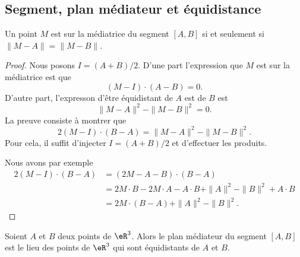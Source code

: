 \subsection{Segment, plan médiateur et équidistance}

\begin{lemma}   \label{LEMooSZZWooPDHnGl}
	Un point \( M\) est sur la médiatrice du segment \( [A,B]\) si et seulement si \( \| M-A \|=\| M-B \|\).
\end{lemma}

\begin{proof}
	Nous posons \( I=(A+B)/2\). D'une part l'expression que \( M\) est sur la médiatrice est que
	\begin{equation}
		(M-I)\cdot (A-B)=0.
	\end{equation}
	D'autre part, l'expresson d'être équidistant de \( A\) est de \( B\) est
	\begin{equation}
		\| M-A \|^2-\| M-B \|^2=0.
	\end{equation}
	La preuve consiste à montrer que
	\begin{equation}
		2(M-I)\cdot (B-A)=\| M-A \|^2-\| M-B \|^2.
	\end{equation}
	Pour cela, il suffit d'injecter \( I=(A+B)/2\) et d'effectuer les produits.

	Nous avons par exemple
	\begin{subequations}
		\begin{align}
			2(M-I)\cdot (B-A) & =(2M-A-B)\cdot(B-A)                                        \\
			                  & =2M\cdot B-2M\cdot A-A\cdot B+\| A \|^2-\| B \|^2+A\cdot B \\
			                  & =2M\cdot (B-A)+\| A \|^2-\| B \|^2.
		\end{align}
	\end{subequations}
\end{proof}

\begin{lemma}       \label{LEMooVBVUooOTFFXT}
	Soient \( A\) et \( B\) deux points de \( \eR^3\). Alors le plan médiateur du segment \( [A,B]\) est le lieu des points de \( \eR^3\) qui sont équidistants de \( A\) et \( B\).
\end{lemma}

